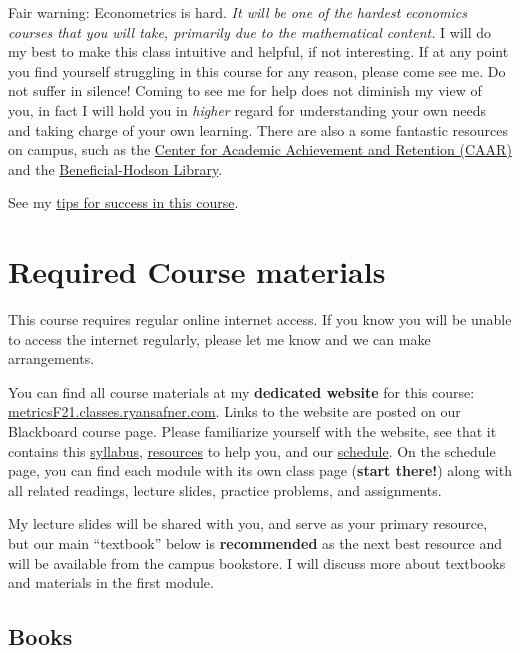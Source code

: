 \documentclass{article}
\begin{document}
{Fair warning: Econometrics is hard.} \emph{It will be one of the
hardest economics courses that you will take, primarily due to the
mathematical content.} I will do my best to make this class intuitive
and helpful, if not interesting. If at any point you find yourself
struggling in this course for any reason, please come see me. Do not
suffer in silence! Coming to see me for help does not diminish my view
of you, in fact I will hold you in \emph{higher} regard for
understanding your own needs and taking charge of your own learning.
There are also a some fantastic resources on campus, such as the
\href{http://www.hood.edu/campus-services/academic-services/index.html}{Center
for Academic Achievement and Retention (CAAR)} and the
\href{http://www.hood.edu/library/\%7D\%7BBeneficial-Hodson\%20Library}{Beneficial-Hodson
Library}.

See my \href{/resources}{tips for success in this course}.

\hypertarget{required-course-materials}{%
\section{Required Course materials}\label{required-course-materials}}

This course requires regular online internet access. If you know you
will be unable to access the internet regularly, please let me know and
we can make arrangements.

You can find all course materials at my \textbf{dedicated website} for
this course:
\href{https://metricsF21.classes.ryansafner.com}{metricsF21.classes.ryansafner.com}.
Links to the website are posted on our Blackboard course page. Please
familiarize yourself with the website, see that it contains this
\href{https://metricsF21.classes.ryansafner.com/syllabus/}{syllabus},
\href{https://metricsF21.classes.ryansafner.com/resources/}{resources}
to help you, and our
\href{https://metricsF21.classes.ryansafner.com/schedule/}{schedule}. On
the schedule page, you can find each module with its own class page
(\textbf{start there!}) along with all related readings, lecture slides,
practice problems, and assignments.

My lecture slides will be shared with you, and serve as your primary
resource, but our main ``textbook'' below is \textbf{recommended} as the
next best resource and will be available from the campus bookstore. I
will discuss more about textbooks and materials in the first module.

\hypertarget{books}{%
\subsection*{Books}\label{books}}
\end{document}
